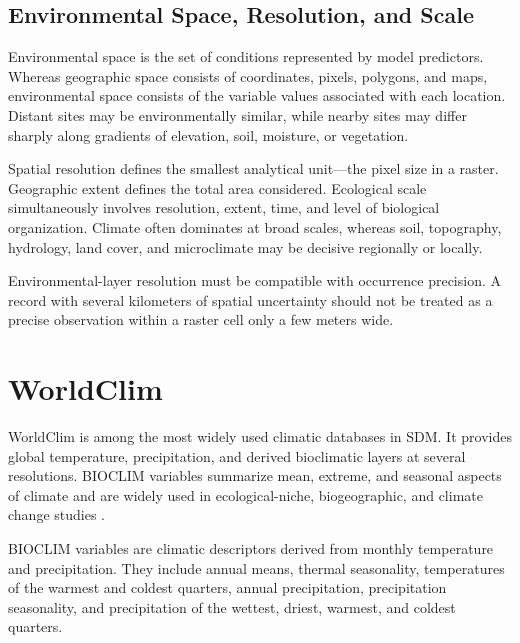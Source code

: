 \subsection{Environmental Space, Resolution, and Scale}

Environmental space is the set of conditions represented by model predictors.
Whereas geographic space consists of coordinates, pixels, polygons, and maps,
environmental space consists of the variable values associated with each
location. Distant sites may be environmentally similar, while nearby sites may
differ sharply along gradients of elevation, soil, moisture, or vegetation.

Spatial resolution defines the smallest analytical unit---the pixel size in a
raster. Geographic extent defines the total area considered. Ecological scale
simultaneously involves resolution, extent, time, and level of biological
organization. Climate often dominates at broad scales, whereas soil,
topography, hydrology, land cover, and microclimate may be decisive regionally
or locally.

\begin{atencao}[title={\faExclamationTriangle\quad Compatibility between occurrences and environment}]
Environmental-layer resolution must be compatible with occurrence precision.
A record with several kilometers of spatial uncertainty should not be treated
as a precise observation within a raster cell only a few meters wide.
\end{atencao}

\section{WorldClim}

WorldClim is among the most widely used climatic databases in SDM. It provides
global temperature, precipitation, and derived bioclimatic layers at several
resolutions. BIOCLIM variables summarize mean, extreme, and seasonal aspects of
climate and are widely used in ecological-niche, biogeographic, and climate
change studies \parencite{fick2017worldclim}.

\begin{conceito}[title={\faBook\quad BIOCLIM variables}]
BIOCLIM variables are climatic descriptors derived from monthly temperature and
precipitation. They include annual means, thermal seasonality, temperatures of
the warmest and coldest quarters, annual precipitation, precipitation
seasonality, and precipitation of the wettest, driest, warmest, and coldest
quarters.
\end{conceito}

